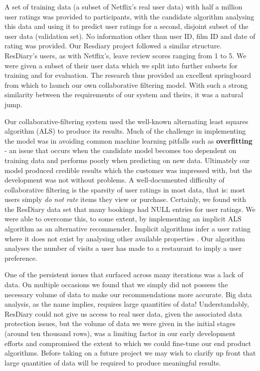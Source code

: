 \documentclass{l3proj}
\begin{document}
A set of training data (a subset of Netflix's real user data) with half a million user ratings was provided to participants, with the candidate algorithm analysing this data and using it to predict user ratings for a second, disjoint subset of the user data (validation set). No information other than user ID, film ID and date of rating was provided. Our Resdiary project followed a similar structure. ResDiary's users, as with Netflix's, leave review scores ranging from 1 to 5. We were given a subset of their user data which we split into further subsets for training and for evaluation. The research thus provided an excellent springboard from which to launch our own collaborative filtering model. With such a strong similarity between the requirements of our system and theirs, it was a natural jump.

Our collaborative-filtering system used the well-known alternating least squares algorithm (ALS) \cite{ALS} to produce its results. Much of the challenge in implementing the model was in avoiding common machine learning pitfalls such as \textbf{overfitting} - an issue that occurs when the candidate model becomes too dependent on training data and performs poorly when predicting on new data. Ultimately our model produced credible results which the customer was impressed with, but the development was not without problems. A well-documented \cite{CollabFilter} difficulty of collaborative filtering is the sparsity of user ratings in most data, that is: most users simply \textit{do not rate} items they view or purchase. Certainly, we found with the ResDiary data set that many bookings had NULL entries for user ratings. We were able to overcome this, to some extent, by implementing an implicit ALS algorithm as an alternative recommender. Implicit algorithms infer a user rating where it does not exist by analysing other available properties \cite{ImplicitALS}. Our algorithm analyses the number of visits a user has made to a restaurant to imply a user preference.

One of the persistent issues that surfaced across many iterations was a lack of data. On multiple occasions we found that we simply did not possess the necessary volume of data to make our recommendations more accurate. Big data analysis, as the name implies, requires large quantities of data! Understandably, ResDiary could not give us access to real user data, given the associated data protection issues, but the volume of data we were given in the initial stages (around ten thousand rows), was a limiting factor in our early development efforts and compromised the extent to which we could fine-tune our end product algorithms. Before taking on a future project we may wish to clarify up front that large quantities of data will be required to produce meaningful results.
\end{document}
